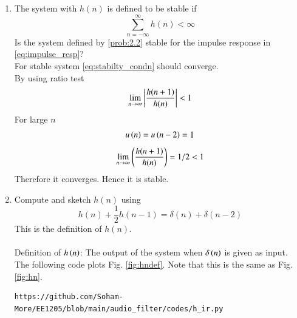 \documentclass[journal,12pt,twocolumn]{IEEEtran}
\theoremstyle{remark}
\begin{document}
\begin{enumerate}[label=\thesection.\arabic*]
\item The system with $h(n)$ is defined to be stable if
\begin{equation}
\sum_{n=-\infty}^{\infty}h(n) < \infty \label{eq:stabilty_condn}
\end{equation}
Is the system defined by \eqref{prob:2.2} stable for the impulse response in \eqref{eq:impulse_resp}?\\
\solution For stable system \eqref{eq:stabilty_condn} should converge.\\
By using ratio test
\begin{align}
    \lim_{n \to \infty}\left\vert\frac{h(n + 1)}{h(n)}\right\vert &< 1 \\
\end{align}
For large $n$ 
\begin{align}
    u\left(n\right) = u\left(n-2\right) = 1
\end{align}
\begin{align}
  \lim_{n \to \infty}  \left(\frac{h(n + 1)}{h(n)}\right) = 1/2 < 1
\end{align}
Therefore it converges. Hence it is stable.

\item 
Compute and sketch $h(n)$ using 
\begin{equation}
    h(n) + \frac{1}{2}h(n-1) = \delta(n) + \delta(n-2) \label{eq:iir_filter_h}
\end{equation}
This is the definition of $h(n)$.\\
\solution\\
Definition of $h\left(n\right)$: The output of the system when $\delta\left(n\right)$ is given as input.\\

The following code plots Fig. \ref{fig:hndef}. Note that this is the same as Fig. 
\ref{fig:hn}. 

\begin{lstlisting}
https://github.com/Soham-More/EE1205/blob/main/audio_filter/codes/h_ir.py
\end{lstlisting}


\end{enumerate}
\end{document}
